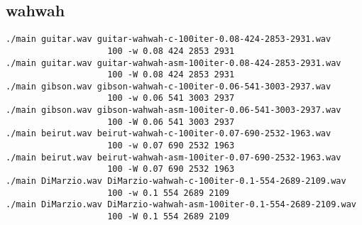 \subsection{wahwah}
\label{subsec:resultados-wahwah} 

\begin{center}
\end{center}

\lstset{language=bash}
\begin{lstlisting}[frame=single]
./main guitar.wav guitar-wahwah-c-100iter-0.08-424-2853-2931.wav 
					100 -w 0.08 424 2853 2931
./main guitar.wav guitar-wahwah-asm-100iter-0.08-424-2853-2931.wav 
					100 -W 0.08 424 2853 2931
./main gibson.wav gibson-wahwah-c-100iter-0.06-541-3003-2937.wav 
					100 -w 0.06 541 3003 2937
./main gibson.wav gibson-wahwah-asm-100iter-0.06-541-3003-2937.wav 
					100 -W 0.06 541 3003 2937
./main beirut.wav beirut-wahwah-c-100iter-0.07-690-2532-1963.wav 
					100 -w 0.07 690 2532 1963
./main beirut.wav beirut-wahwah-asm-100iter-0.07-690-2532-1963.wav 
					100 -W 0.07 690 2532 1963
./main DiMarzio.wav DiMarzio-wahwah-c-100iter-0.1-554-2689-2109.wav 
					100 -w 0.1 554 2689 2109
./main DiMarzio.wav DiMarzio-wahwah-asm-100iter-0.1-554-2689-2109.wav 
					100 -W 0.1 554 2689 2109
\end{lstlisting} 